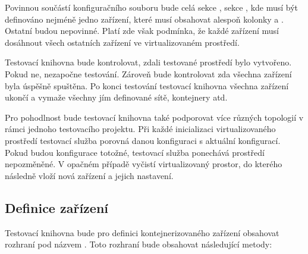 Povinnou součástí konfiguračního souboru bude celá sekce , sekce , kde musí být definováno nejméně jedno zařízení, které musí obsahovat alespoň kolonky  a . Ostatní budou nepovinné. Platí zde však podmínka, že každé zařízení musí dosáhnout všech ostatních zařízení ve virtualizovaném prostředí.

Testovací knihovna bude kontrolovat, zdali testované prostředí bylo vytvořeno. Pokud ne, nezapočne testování. Zároveň bude kontrolovat zda všechna zařízení byla úspěšně spuštěna. Po konci testování testovací knihovna všechna zařízení ukončí a vymaže všechny jím definované sítě, kontejnery atd.

Pro pohodlnost bude testovací knihovna také podporovat více různých topologií v rámci jednoho testovacího projektu. Při každé inicializaci virtualizovaného prostředí testovací služba porovná danou konfiguraci s aktuální konfigurací. Pokud budou konfigurace totožné, testovací služba ponechává prostředí nepozměněné. V opačném případě vyčistí virtualizovaný prostor, do kterého následně vloží nová zařízení a jejich nastavení. 

\subsection{Definice zařízení}\label{sec:cont_design}

Testovací knihovna bude pro definici kontejnerizovaného zařízení obsahovat rozhraní pod názvem . Toto rozhraní bude obsahovat následující metody:

